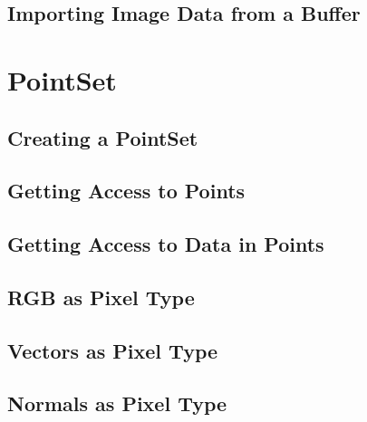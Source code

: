 


\subsection{Importing Image Data from a Buffer}
\label{sec:ImportingImageDataFromABuffer}



\section{PointSet}
\label{PointSetSection}

\subsection{Creating a PointSet}
\label{sec:CreatingAPointSet}




\subsection{Getting Access to Points}
\label{sec:GettingAccessToPointsInThePointSet}




\subsection{Getting Access to Data in Points}
\label{sec:GettingAccessToDataInThePointSet}




\subsection{RGB as Pixel Type}
\label{sec:PointSetWithRGBAsPixelType}




\subsection{Vectors as Pixel Type}
\label{sec:PointSetWithVectorsAsPixelType}




\subsection{Normals as Pixel Type}
\label{sec:PointSetWithCovariantVectorsAsPixelType}

